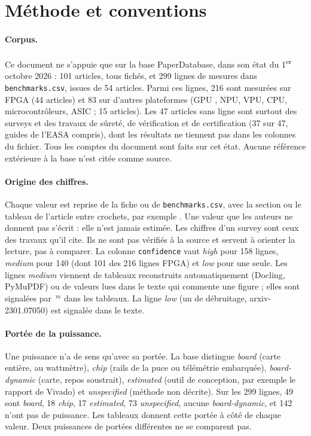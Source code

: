\section{Méthode et conventions}
\label{sec:methode}

\paragraph{Corpus.} Ce document ne s'appuie que sur la base PaperDatabase, dans son état du
1\textsuperscript{er} octobre 2026 : 101 articles, tous fichés, et 299 lignes de mesures
dans \texttt{benchmarks.csv}, issues de 54 articles. Parmi ces lignes, 216 sont mesurées
sur FPGA (44 articles) et 83 sur d'autres plateformes (GPU , NPU, VPU, CPU,
microcontrôleurs, ASIC ; 15 articles). Les 47 articles sans ligne sont surtout des surveys et
des travaux de sûreté, de vérification et de certification (37 sur 47, guides de l'EASA
compris), dont les résultats ne tiennent pas dans les colonnes du fichier. Tous les comptes du
document sont faits sur cet état. Aucune référence extérieure à la base n'est citée comme
source.

\paragraph{Origine des chiffres.} Chaque valeur est reprise de la fiche ou de
\texttt{benchmarks.csv}, avec la section ou le tableau de l'article entre crochets, par
exemple . Une valeur que les auteurs ne donnent pas s'écrit \nr{} : elle n'est
jamais estimée. Les chiffres d'un survey sont ceux des travaux qu'il cite. Ils ne sont pas
vérifiés à la source et servent à orienter la lecture, pas à comparer. La colonne
\texttt{confidence} vaut \emph{high} pour 158 lignes, \emph{medium} pour 140 (dont 101 des
216 lignes FPGA) et \emph{low} pour une seule. Les lignes \emph{medium} viennent de
tableaux reconstruits automatiquement (Docling, PyMuPDF) ou de valeurs lues dans le texte
qui commente une figure ; elles sont signalées par~$^{m}$ dans les tableaux. La ligne
\emph{low} (un  de débruitage, arxiv-2301.07050\pp) est signalée dans le texte.

\paragraph{Portée de la puissance.} Une puissance n'a de sens qu'avec sa portée. La base
distingue \emph{board} (carte entière, au wattmètre), \emph{chip} (rails de la puce ou
télémétrie embarquée), \emph{board-dynamic} (carte, repos soustrait), \emph{estimated}
(outil de conception, par exemple le rapport de Vivado) et \emph{unspecified} (méthode non
décrite). Sur les 299 lignes, 49 sont \emph{board}, 18 \emph{chip}, 17 \emph{estimated},
73 \emph{unspecified}, aucune \emph{board-dynamic}, et 142 n'ont pas de puissance. Les
tableaux donnent cette portée à côté de chaque valeur. Deux puissances de portées
différentes ne se comparent pas.


